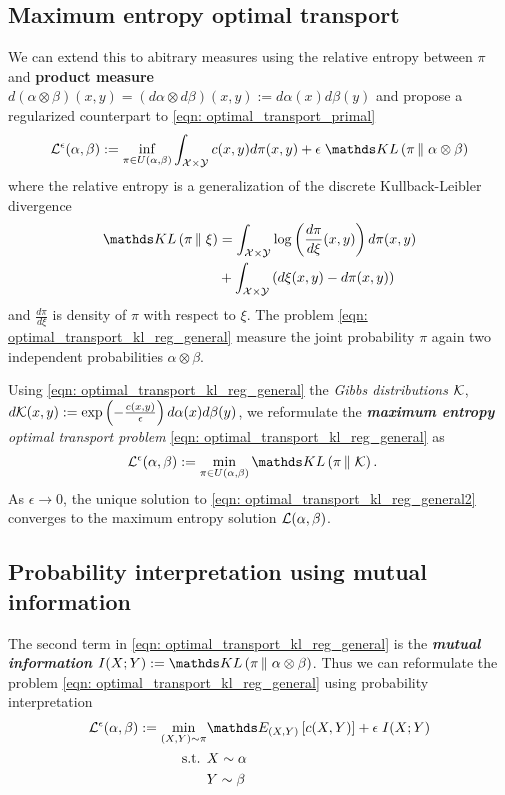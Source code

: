 \documentclass[11pt]{article}
\begin{document}
\subsection{Maximum entropy optimal transport}
We can extend this to abitrary measures using the relative entropy between $\pi$ and \textbf{product measure} $d (\alpha \otimes \beta) (x, y) = (d\alpha \otimes d\beta)(x, y)  := d\alpha(x)d\beta(y)$ and propose a regularized counterpart to \eqref{eqn: optimal_transport_primal}
\begin{align}
\cL^{\epsilon}(\alpha, \beta) :=\inf_{\pi \in U(\alpha, \beta)} \int_{\cX \times \cY} c(x, y) d \pi(x, y) + \epsilon\; \kl{\pi}{\alpha\otimes \beta} \label{eqn: optimal_transport_kl_reg_general}
\end{align} where the relative entropy is a generalization of the discrete Kullback-Leibler divergence
\begin{align}
 \kl{\pi}{\xi}  &= \int_{\cX \times \cY}\log\paren{\frac{d \pi }{d \xi} (x, y)}d\pi(x, y)  \nonumber\\
 &+  \int_{\cX \times \cY}\paren{d \xi (x, y) - d \pi (x, y)} \label{eqn: kl_divergence}
\end{align} and $\frac{d \pi }{d \xi}$ is density of $\pi$ with respect to $\xi$. The problem \eqref{eqn: optimal_transport_kl_reg_general} measure the joint probability $\pi$ again two independent probabilities $\alpha \otimes \beta$.

Using \eqref{eqn: optimal_transport_kl_reg_general} the \emph{Gibbs distributions} ${\mathcal K}$, $d{\mathcal K}(x,y) := \exp\left(- \frac{c(x, y)}{\epsilon}\right)d\alpha(x)d\beta(y)$, we reformulate  the \emph{\textbf{maximum entropy} optimal transport problem} \eqref{eqn: optimal_transport_kl_reg_general} as
\begin{align}
\cL^{\epsilon}(\alpha, \beta) &:= \min_{\pi \in U(\alpha, \beta)} \kl{\pi}{\cK}. \label{eqn: optimal_transport_kl_reg_general2}
\end{align} As $\epsilon \rightarrow 0$, the unique solution to \eqref{eqn: optimal_transport_kl_reg_general2} converges to the maximum entropy solution ${\mathcal L}(\alpha, \beta)$.

\subsection{Probability interpretation using mutual information}
The second term in \eqref{eqn: optimal_transport_kl_reg_general} is the \textbf{\emph{mutual information}} $I(X; Y) := \kl{\pi}{\alpha\otimes \beta}$. Thus we can reformulate the problem \eqref{eqn: optimal_transport_kl_reg_general} using probability interpretation
\begin{align}
\cL^{\epsilon}(\alpha, \beta) :=\min_{(X, Y) \sim \pi}& \E{(X,Y)}{c(X, Y)} + \epsilon\; I(X; Y) \label{eqn: optimal_transport_mutual_info} \\
\text{s.t. }& X\sim \alpha \nonumber\\
&Y \sim \beta \nonumber
\end{align} 
\end{document}
